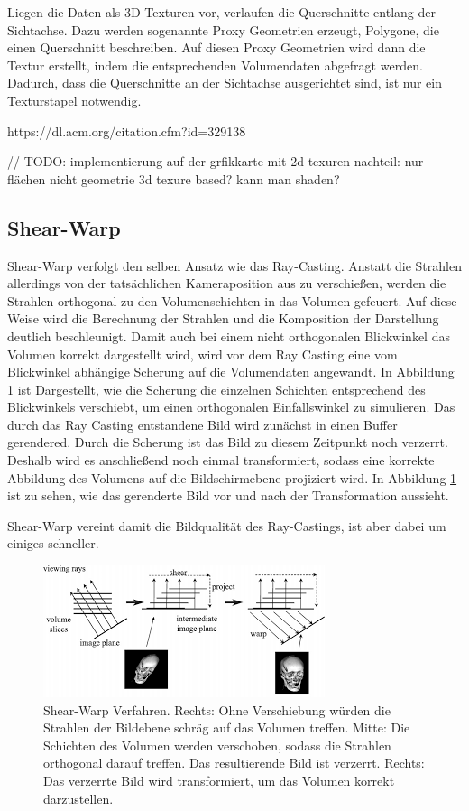 Liegen die Daten als 3D-Texturen vor, verlaufen die Querschnitte entlang der Sichtachse. Dazu werden sogenannte Proxy Geometrien erzeugt, Polygone, die einen Querschnitt beschreiben. Auf diesen Proxy Geometrien wird dann die Textur erstellt, indem die entsprechenden Volumendaten abgefragt werden. Dadurch, dass die Querschnitte an der Sichtachse ausgerichtet sind, ist nur ein Texturstapel notwendig. 


https://dl.acm.org/citation.cfm?id=329138

// TODO:
implementierung auf der grfikkarte mit 2d texuren nachteil: nur flächen nicht geometrie
3d texure based? 	
kann man shaden?

\subsection{Shear-Warp}

Shear-Warp verfolgt den selben Ansatz wie das Ray-Casting. Anstatt die Strahlen allerdings von der tatsächlichen Kameraposition aus zu verschießen, werden die Strahlen orthogonal zu den Volumenschichten in das Volumen gefeuert. Auf diese Weise wird die Berechnung der Strahlen und die Komposition der Darstellung deutlich beschleunigt. 
Damit auch bei einem nicht orthogonalen Blickwinkel das Volumen korrekt dargestellt wird, wird vor dem Ray Casting eine vom Blickwinkel abhängige Scherung auf die Volumendaten angewandt. In Abbildung \ref{img:shearwarp} ist Dargestellt, wie die Scherung die einzelnen Schichten entsprechend des Blickwinkels verschiebt, um einen orthogonalen Einfallswinkel zu simulieren. 
Das durch das Ray Casting entstandene Bild wird zunächst in einen Buffer gerendered. Durch die Scherung ist das Bild zu diesem Zeitpunkt noch verzerrt. Deshalb wird es anschließend noch einmal transformiert, sodass eine korrekte Abbildung des Volumens auf die Bildschirmebene projiziert wird. In Abbildung \ref{img:shearwarp} ist zu sehen, wie das gerenderte Bild vor und nach der Transformation aussieht. 

Shear-Warp vereint damit die Bildqualität des Ray-Castings, ist aber dabei um einiges schneller.

\begin{figure}
	\centering
	\includegraphics[width=0.7\linewidth]{images/shearwarp.png}
	\caption{Shear-Warp Verfahren. Rechts: Ohne Verschiebung würden die Strahlen der Bildebene schräg auf das Volumen treffen. Mitte: Die Schichten des Volumen werden verschoben, sodass die Strahlen orthogonal darauf treffen. Das resultierende Bild ist verzerrt. Rechts: Das verzerrte Bild wird transformiert, um das Volumen korrekt darzustellen.}
	\label{img:shearwarp}
\end{figure}

